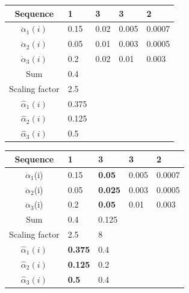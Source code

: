 \begin{frame}[noframenumbering]
\begin{table}[h]
\begin{tabular}{|c|l|l|l|l|}
 \hline
Sequence      & 1     & 3    & 3     & 2      \\ \hline
$\ddot{\alpha}_1(i)$          & 0.15  & 0.02 & 0.005 & 0.0007 \\ \hline
$\ddot{\alpha}_2(i)$          & 0.05  & 0.01 & 0.003 & 0.0005 \\ \hline
$\ddot{\alpha}_3(i)$          & 0.2   & 0.02 & 0.01  & 0.003  \\ \hline
Sum            & 0.4   &      &       &        \\ \hline
Scaling factor & 2.5   &      &       &        \\ \hline
$\hat{\alpha}_1(i)$          & 0.375 &      &       &        \\ \hline
$\hat{\alpha}_2(i)$          & 0.125 &      &       &        \\ \hline
$\hat{\alpha}_3(i)$          & 0.5   &      &       &        \\ \hline
\end{tabular}
\end{table}
\end{frame}

\begin{frame}[noframenumbering]
\begin{table}[h]
\begin{tabular}{|c|l|l|l|l|}
 \hline
Sequence      & 1              & 3              & 3     & 2      \\ \hline
$\ddot{\alpha}_1$(i)          & 0.15           & \textbf{0.05}  & 0.005 & 0.0007 \\ \hline
$\ddot{\alpha}_2$(i)          & 0.05           & \textbf{0.025} & 0.003 & 0.0005 \\ \hline
$\ddot{\alpha}_3$(i)          & 0.2            & \textbf{0.05}  & 0.01  & 0.003  \\ \hline
Sum            & 0.4            & 0.125          &       &        \\ \hline
Scaling factor & 2.5            & 8              &       &        \\ \hline
$\hat{\alpha}_1(i)$          & \textbf{0.375} & 0.4            &       &        \\ \hline
$\hat{\alpha}_2(i)$          & \textbf{0.125} & 0.2            &       &        \\ \hline
$\hat{\alpha}_3(i)$          & \textbf{0.5}   & 0.4            &       &        \\ \hline
\end{tabular}
\end{table}
\end{frame}

